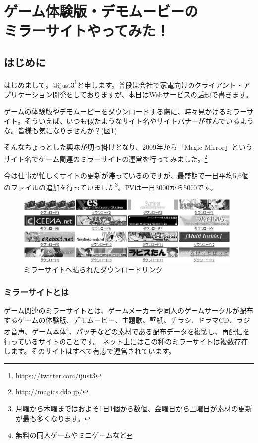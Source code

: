 \section{ゲーム体験版・デモムービーの\\ ミラーサイトやってみた！}

\subsection{はじめに}
はじめまして。@ijust3\footnote{https://twitter.com/ijust3}と申します。普段は会社で家電向けのクライアント・アプリケーション開発をしておりますが、本日はWebサービスの話題で書きます。

ゲームの体験版やデモムービーをダウンロードする際に、時々見かけるミラーサイト。そういえば、いつも似たようなサイト名やサイトバナーが並んでいるような。皆様も気になりませんか？(図\ref{fig:mirrors})

そんなちょっとした興味が切っ掛けとなり、2009年から「Magic Mirror」というサイト名でゲーム関連のミラーサイトの運営を行ってみました。\footnote{http://magics.ddo.jp/}

今は仕事が忙しくサイトの更新が滞っているのですが、最盛期で一日平均5,6個のファイルの追加を行っていました\footnote{月曜から木曜まではおよそ1日1個から数個、金曜日から土曜日が素材の更新が最も多くなります。}。PVは一日3000から5000です。

\begin{figure}[hbp]
 \begin{center}
  \includegraphics[width=110mm]{ijust3-mirror/img/mirrors.eps}
 \end{center}
 \caption{ミラーサイトへ貼られたダウンロードリンク}
 \label{fig:mirrors}
\end{figure}

\subsubsection{ミラーサイトとは}

ゲーム関連のミラーサイトとは、ゲームメーカーや同人のゲームサークルが配布するゲームの体験版、デモムービー、主題歌、壁紙、チラシ、ドラマCD、ラジオ音声、ゲーム本体\footnote{無料の同人ゲームやミニゲームなど}、パッチなどの素材である配布データを複製し、再配信を行っているサイトのことです。%
ネット上にはこの種のミラーサイトは複数存在します。そのサイトはすべて有志で運営されています。

